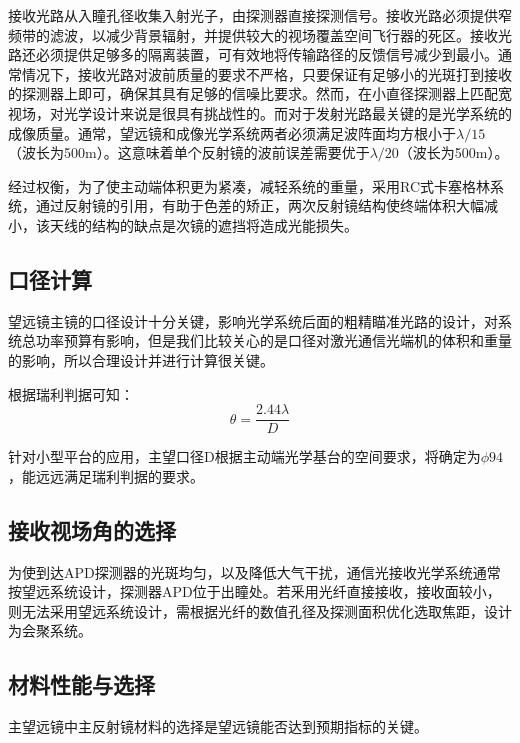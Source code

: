 接收光路从入瞳孔径收集入射光子，由探测器直接探测信号。接收光路必须提供窄频带的滤波，以减少背景辐射，并提供较大的视场覆盖空间飞行器的死区。接收光路还必须提供足够多的隔离装置，可有效地将传输路径的反馈信号减少到最小。通常情况下，接收光路对波前质量的要求不严格，只要保证有足够小的光斑打到接收的探测器上即可，确保其具有足够的信噪比要求。然而，在小直径探测器上匹配宽视场，对光学设计来说是很具有挑战性的。而对于发射光路最关键的是光学系统的成像质量。通常，望远镜和成像光学系统两者必须满足波阵面均方根小于$\lambda /15$（波长为500m）。这意味着单个反射镜的波前误差需要优于$\lambda /20$（波长为500m）。

经过权衡，为了使主动端体积更为紧凑，减轻系统的重量，采用RC式卡塞格林系统，通过反射镜的引用，有助于色差的矫正，两次反射镜结构使终端体积大幅减小，该天线的结构的缺点是次镜的遮挡将造成光能损失。
\subsection{口径计算}
望远镜主镜的口径设计十分关键，影响光学系统后面的粗精瞄准光路的设计，对系统总功率预算有影响，但是我们比较关心的是口径对激光通信光端机的体积和重量的影响，所以合理设计并进行计算很关键。

根据瑞利判据可知：
\begin{equation}\label{瑞利判据}
\theta = \dfrac{2.44\lambda }{D}
\end{equation}

针对小型平台的应用，主望口径D根据主动端光学基台的空间要求，将确定为$\phi 94$，能远远满足瑞利判据的要求。




\subsection{接收视场角的选择}

为使到达APD探测器的光斑均匀，以及降低大气干扰，通信光接收光学系统通常按望远系统设计，探测器APD位于出瞳处。若釆用光纤直接接收，接收面较小，则无法采用望远系统设计，需根据光纤的数值孔径及探测面积优化选取焦距，设计为会聚系统。
\subsection{材料性能与选择}
主望远镜中主反射镜材料的选择是望远镜能否达到预期指标的关键。

